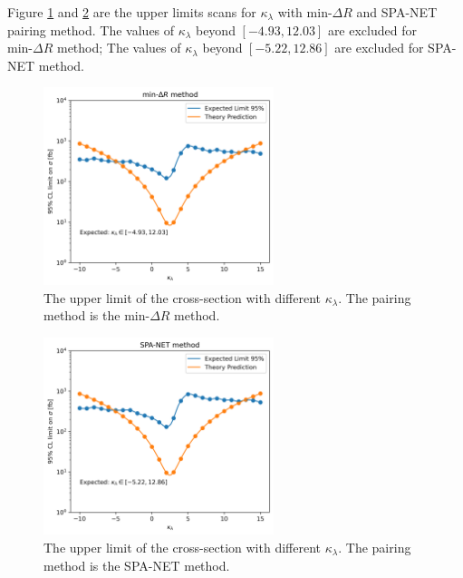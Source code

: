 \documentclass[12pt]{article}
\begin{document}
		Figure \ref{fig:CL_limit_kappa_min_dR} and \ref{fig:CL_limit_kappa_SPANET} are the upper limits scans for $\kappa_\lambda$ with $\text{min-}\Delta R$ and SPA-NET pairing method. The values of $\kappa_\lambda$ beyond $\left[ -4.93, 12.03 \right]$ are excluded for $\text{min-}\Delta R$ method; The values of $\kappa_\lambda$ beyond $\left[ -5.22, 12.86 \right]$ are excluded for SPA-NET method.
		\begin{figure}[htpb]
			\centering
			\includegraphics[width=0.6\textwidth]{CL_limit_kappa_min_dR.png}
			\caption{The upper limit of the cross-section with different $\kappa_\lambda$. The pairing method is the $\text{min-}\Delta R$ method.}
			\label{fig:CL_limit_kappa_min_dR}
		\end{figure}
		\begin{figure}[htpb]
			\centering
			\includegraphics[width=0.6\textwidth]{CL_limit_kappa_SPANET.png}
			\caption{The upper limit of the cross-section with different $\kappa_\lambda$. The pairing method is the SPA-NET method.}
			\label{fig:CL_limit_kappa_SPANET}
		\end{figure}

\end{document}
